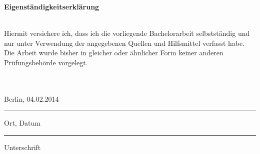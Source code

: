\documentclass[a4paper,11pt,oneside,%
headsepline,												%
footsepline,												%
bibtotocnumbered									%
]{scrreprt}
\begin{document}
\newpage

\hfil\\\\\\

\begin{LARGE}
\textbf{Eigenständigkeitserklärung}\\\\
\end{LARGE} 
Hiermit versichere ich, dass ich die vorliegende Bachelorarbeit selbstständig und nur
unter Verwendung der angegebenen Quellen und Hilfsmittel verfasst habe. Die Arbeit
wurde bisher in gleicher oder ähnlicher Form keiner anderen Prüfungsbehörde vorgelegt.\\\\\\

\parbox{4cm}{\centering Berlin, 04.02.2014\hrule
\strut \centering\footnotesize Ort, Datum} \hfill\parbox{4cm}{\hrule
\strut \centering\footnotesize Unterschrift}
\end{document}
